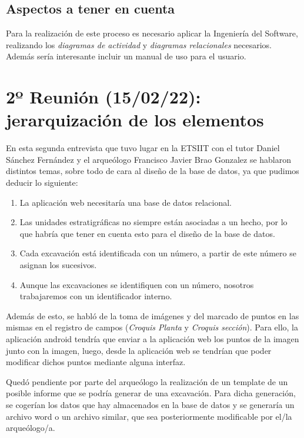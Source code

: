     \subsection{Aspectos a tener en cuenta}
    Para la realización de este proceso es necesario aplicar la Ingeniería del Software,
    realizando los \textit{diagramas de actividad} y \textit{diagramas relacionales} necesarios.
    Además sería interesante incluir un manual de uso para el usuario.

\section{2º Reunión (15/02/22): jerarquización de los elementos}
En esta segunda entrevista que tuvo lugar en la ETSIIT con el tutor Daniel Sánchez Fernández
y el arqueólogo Francisco Javier Brao Gonzalez se hablaron distintos temas, sobre todo de cara
al diseño de la base de datos, ya que pudimos deducir lo siguiente:

    \begin{enumerate}
        \item La aplicación web necesitaría una base de datos relacional.
        \item Las unidades estratigráficas no siempre están asociadas a un hecho, por lo
        que habría que tener en cuenta esto para el diseño de la base de datos.
        \item Cada excavación está identificada con un número, a partir de este número
        se asignan los sucesivos.
        \item Aunque las excavaciones se identifiquen con un número, nosotros trabajaremos
        con un identificador interno.
    \end{enumerate}

Además de esto, se habló de la toma de imágenes y del marcado de puntos en las mismas en el
registro de campos (\textit{Croquis Planta} y \textit{Croquis sección}). Para ello, la
aplicación android tendría que enviar a la aplicación web los puntos de la imagen junto con
la imagen, luego, desde la aplicación web se tendrían que poder modificar dichos puntos mediante
alguna interfaz. 

Quedó pendiente por parte del arqueólogo la realización de un template de un posible informe
que se podría generar de una excavación. Para dicha generación, se cogerían los datos
que hay almacenados en la base de datos y se generaría un archivo word o un archivo similar,
que sea posteriormente modificable por el/la arqueólogo/a.


